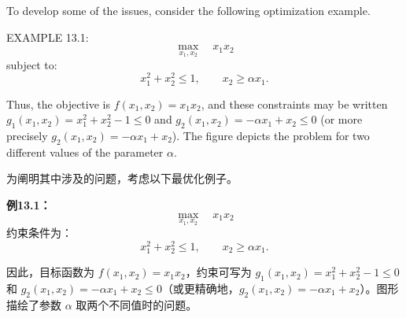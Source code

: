 \begin{original}
To develop some of the issues, consider the following optimization example.

EXAMPLE 13.1:
\[
\max_{x_1,x_2} \quad x_1 x_2
\]
subject to:
\[
x_1^2 + x_2^2 \le 1, \qquad x_2 \ge \alpha x_1.
\]

Thus, the objective is $f(x_1, x_2) = x_1x_2$, and these constraints may be written $g_1(x_1, x_2) = x_1^2 + x_2^2 - 1 \le 0$ and $g_2(x_1, x_2) = -\alpha x_1 + x_2 \le 0$ (or more precisely $g_2(x_1, x_2) = -\alpha x_1 + x_2$). The figure depicts the problem for two different values of the parameter $\alpha$.
\end{original}
\begin{translation}
为阐明其中涉及的问题，考虑以下最优化例子。

\textbf{例13.1：}
\[
\max_{x_1,x_2} \quad x_1 x_2
\]
约束条件为：
\[
x_1^2 + x_2^2 \le 1, \qquad x_2 \ge \alpha x_1.
\]

因此，目标函数为 $f(x_1, x_2) = x_1x_2$，约束可写为 $g_1(x_1, x_2) = x_1^2 + x_2^2 - 1 \le 0$ 和 $g_2(x_1, x_2) = -\alpha x_1 + x_2 \le 0$（或更精确地，$g_2(x_1, x_2) = -\alpha x_1 + x_2$）。图形描绘了参数 $\alpha$ 取两个不同值时的问题。
\end{translation}

